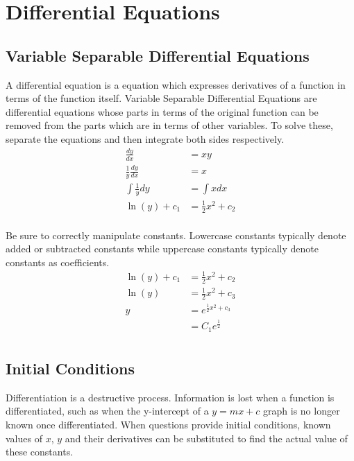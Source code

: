 \documentclass[../main]{subfiles}
\begin{document}
\section{Differential Equations}

	\subsection{Variable Separable Differential Equations}

	A differential equation is a equation which expresses derivatives of a function in terms of the function itself. Variable Separable Differential Equations are differential equations whose parts in terms of the original function can be removed from the parts which are in terms of other variables. To solve these, separate the equations and then integrate both sides respectively. \\

	\begin{equation*} \begin{aligned}
		\frac{dy}{dx} & = xy \\
		\frac{1}{y} \frac{dy}{dx} & = x \\
		\int \frac{1}{y} dy & = \int x dx \\
		\ln(y) + c_1 & = \frac{1}{2} x^2 + c_2 \\
	\end{aligned} \end{equation*}

	Be sure to correctly manipulate constants. Lowercase constants typically denote added or subtracted constants while uppercase constants typically denote constants as coefficients. \\

	\begin{equation*} \begin{aligned}
		\ln(y) + c_1 & = \frac{1}{2} x^2 + c_2 \\
		\ln(y) & = \frac{1}{2} x^2 + c_3 \\
		y & = e^{\frac{1}{2} x^2 + c_3} \\
		& = C_1e^{\frac{1}{2}} \\
	\end{aligned} \end{equation*}

	\subsection{Initial Conditions}

	Differentiation is a destructive process. Information is lost when a function is differentiated, such as when the y-intercept of a \(y=mx+c\) graph is no longer known once differentiated. When questions provide initial conditions, known values of \(x\), \(y\) and their derivatives can be substituted to find the actual value of these constants. \\
\end{document}
